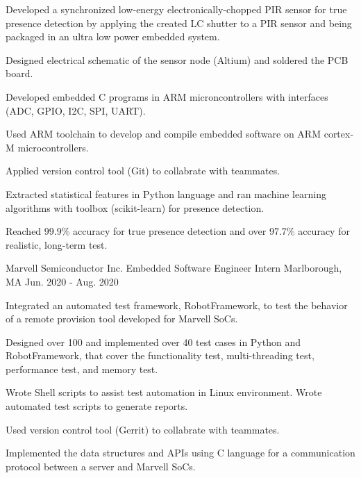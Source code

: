 \begin{cventries}
{\begin{cvitems}
        \item Developed a synchronized low-energy electronically-chopped PIR sensor for true presence detection by applying the created LC shutter to a PIR sensor and being packaged in an ultra low power embedded system.
        \item Designed electrical schematic of the sensor node (Altium) and soldered the PCB board.
        \item Developed embedded C programs in ARM microncontrollers with interfaces (ADC, GPIO, I2C, SPI, UART).
        \item Used ARM toolchain to develop and compile embedded software on ARM cortex-M microcontrollers.
        \item Applied version control tool (Git) to collabrate with teammates.
        \item Extracted statistical features in Python language and ran machine learning algorithms with toolbox (scikit-learn) for presence detection.
        \item Reached 99.9\% accuracy for true presence detection and over 97.7\% accuracy for realistic, long-term test. 
      \end{cvitems}
    }
  \cventry
  {Marvell Semiconductor Inc.} 
  {Embedded Software Engineer Intern} %
  {Marlborough, MA} %
  {Jun. 2020 - Aug. 2020} %
  {
    \begin{cvitems} %
      \item Integrated an automated test framework, RobotFramework, to test the behavior of a remote provision tool developed for Marvell SoCs.
      \item Designed over 100 and implemented over 40 test cases in Python and RobotFramework, that cover the functionality test, multi-threading test, performance test, and memory test.
      \item Wrote Shell scripts to assist test automation in Linux environment. Wrote automated test scripts to generate reports.
      \item Used version control tool (Gerrit) to collabrate with teammates.
      \item Implemented the data structures and APIs using C language for a communication protocol between a server and Marvell SoCs.
    \end{cvitems}
  }

  


\end{cventries}
